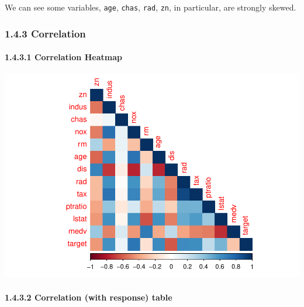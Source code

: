 \documentclass[]{article}
\let\oldparagraph\paragraph
\renewcommand{\paragraph}[1]{\oldparagraph{#1}\mbox{}}
\begin{document}
We can see some variables, \texttt{age}, \texttt{chas}, \texttt{rad},
\texttt{zn}, in particular, are strongly skewed.

\subsubsection{1.4.3 Correlation}\label{correlation}

\paragraph{1.4.3.1 Correlation Heatmap}\label{correlation-heatmap}

\includegraphics{DATA_621_Homework_3_files/figure-latex/summary-correlation-heatmap-1.pdf}

\paragraph{1.4.3.2 Correlation (with response)
table}\label{correlation-with-response-table}
\end{document}
